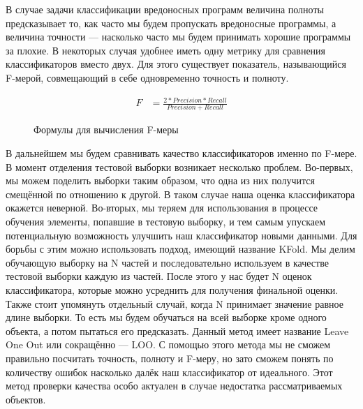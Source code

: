 В случае задачи классификации вредоносных программ величина полноты предсказывает то, как часто мы будем пропускать вредоносные программы, а величина точности — насколько часто мы будем принимать хорошие программы за плохие.
В некоторых случая удобнее иметь одну метрику для сравнения классификаторов вместо двух. Для этого существует показатель, называющийся F-мерой, совмещающий в себе одновременно точность и полноту.

\begin{figure}[ht]
\begin{align}
F &= \frac{2 * Precision * Recall}{Precision + Recall}
\end{align}
\caption{Формулы для вычисления F-меры}
\end{figure}

В дальнейшем мы будем сравнивать качество классификаторов именно по F-мере.
В момент отделения тестовой выборки возникает несколько проблем. Во-первых, мы можем поделить выборки таким образом, что одна из них получится смещённой по отношению к другой. В таком случае наша оценка классификатора окажется неверной. Во-вторых, мы теряем для использования в процессе обучения элементы, попавшие в тестовую выборку, и тем самым упускаем потенциальную возможность улучшить наш классификатор новыми данными. Для борьбы с этим можно использовать подход, имеющий название KFold. Мы делим обучающую выборку на N частей и последовательно используем в качестве тестовой выборки каждую из частей. После этого у нас будет N оценок классификатора, которые можно усреднить для получения финальной оценки. 
Также стоит упомянуть отдельный случай, когда N принимает значение равное длине выборки. То есть мы будем обучаться на всей выборке кроме одного объекта, а потом пытаться его предсказать. Данный метод имеет название Leave One Out или сокращённо — LOO. С помощью этого метода мы не сможем правильно посчитать точность, полноту и F-меру, но зато сможем понять по количеству ошибок насколько далёк наш классификатор от идеального. Этот метод проверки качества особо актуален в случае недостатка рассматриваемых объектов. 

